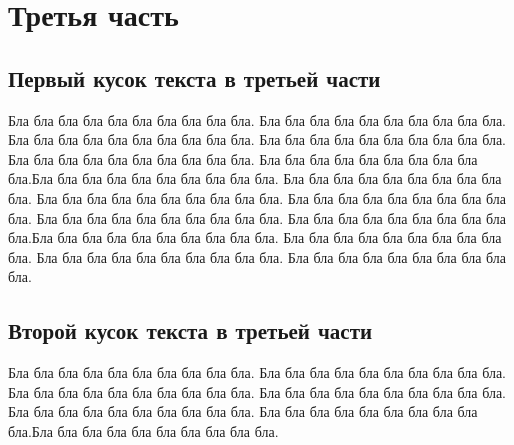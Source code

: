 \documentclass[12pt, a4paper]{article}
\begin{document}
\newpage

\section{Третья часть}


\subsection{Первый кусок текста в третьей части}
Бла бла бла бла бла бла бла бла бла бла. Бла бла бла бла бла бла бла бла бла бла. Бла бла бла бла бла бла бла бла бла бла. Бла бла бла бла бла бла бла бла бла бла. Бла бла бла бла бла бла бла бла бла бла. Бла бла бла бла бла бла бла бла бла бла.Бла бла бла бла бла бла бла бла бла бла. Бла бла бла бла бла бла бла бла бла бла. Бла бла бла бла бла бла бла бла бла бла. Бла бла бла бла бла бла бла бла бла бла. Бла бла бла бла бла бла бла бла бла бла. Бла бла бла бла бла бла бла бла бла бла.Бла бла бла бла бла бла бла бла бла бла. Бла бла бла бла бла бла бла бла бла бла. Бла бла бла бла бла бла бла бла бла бла. Бла бла бла бла бла бла бла бла бла бла. 

\subsection{Второй кусок текста в третьей части}

Бла бла бла бла бла бла бла бла бла бла. Бла бла бла бла бла бла бла бла бла бла. Бла бла бла бла бла бла бла бла бла бла. Бла бла бла бла бла бла бла бла бла бла. Бла бла бла бла бла бла бла бла бла бла. Бла бла бла бла бла бла бла бла бла бла.Бла бла бла бла бла бла бла бла бла бла. 
\newpage
\end{document}
